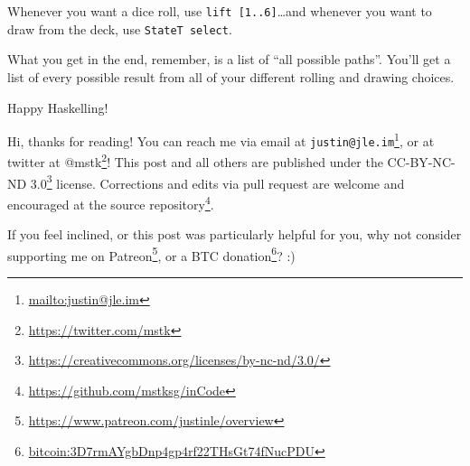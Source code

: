 \documentclass[]{article}
\renewcommand{\href}[2]{#2\footnote{\url{#1}}}
\begin{document}
Whenever you want a dice roll, use \texttt{lift\ {[}1..6{]}}\ldots{}and whenever
you want to draw from the deck, use \texttt{StateT\ select}.

What you get in the end, remember, is a list of ``all possible paths''. You'll
get a list of every possible result from all of your different rolling and
drawing choices.

Happy Haskelling!

Hi, thanks for reading! You can reach me via email at
\href{mailto:justin@jle.im}{\nolinkurl{justin@jle.im}}, or at twitter at
\href{https://twitter.com/mstk}{@mstk}! This post and all others are published
under the \href{https://creativecommons.org/licenses/by-nc-nd/3.0/}{CC-BY-NC-ND
3.0} license. Corrections and edits via pull request are welcome and encouraged
at \href{https://github.com/mstksg/inCode}{the source repository}.

If you feel inclined, or this post was particularly helpful for you, why not
consider \href{https://www.patreon.com/justinle/overview}{supporting me on
Patreon}, or a \href{bitcoin:3D7rmAYgbDnp4gp4rf22THsGt74fNucPDU}{BTC donation}?
:)
\end{document}
